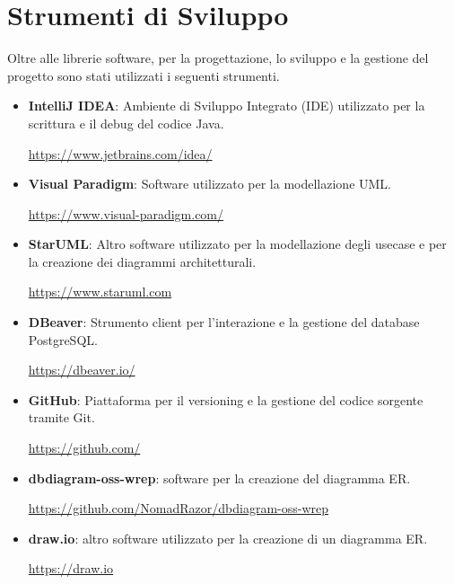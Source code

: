 \documentclass[
  italian,
  paper=a4,
  ,captions=tableheading
]{scrbook}
\begin{document}
\section{Strumenti di Sviluppo}\label{strumenti-di-sviluppo}

Oltre alle librerie software, per la progettazione, lo sviluppo e la
gestione del progetto sono stati utilizzati i seguenti strumenti.

\begin{itemize}
\item
  \textbf{IntelliJ IDEA}: Ambiente di Sviluppo Integrato (IDE)
  utilizzato per la scrittura e il debug del codice Java.

  \url{https://www.jetbrains.com/idea/}
\item
  \textbf{Visual Paradigm}: Software utilizzato per la modellazione UML.

  \url{https://www.visual-paradigm.com/}
\item
  \textbf{StarUML}: Altro software utilizzato per la modellazione degli
  usecase e per la creazione dei diagrammi architetturali.

  \url{https://www.staruml.com}
\item
  \textbf{DBeaver}: Strumento client per l'interazione e la gestione del
  database PostgreSQL.

  \url{https://dbeaver.io/}
\item
  \textbf{GitHub}: Piattaforma per il versioning e la gestione del
  codice sorgente tramite Git.

  \url{https://github.com/}
\item
  \textbf{dbdiagram-oss-wrep}: software per la creazione del diagramma
  ER.

  \url{https://github.com/NomadRazor/dbdiagram-oss-wrep}
\item
  \textbf{draw.io}: altro software utilizzato per la creazione di un
  diagramma ER.

  \url{https://draw.io}
\end{itemize}

\backmatter
\end{document}
